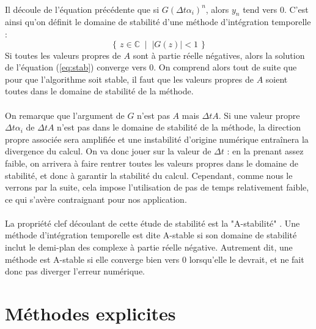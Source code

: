     \paragraph{}
    Il découle de l'équation précédente que si $G\left(\Delta t\alpha_i\right)^n$, alors $y_n$ tend vers 0.
    C'est ainsi qu'on définit le domaine de stabilité d'une méthode d'intégration temporelle :
    $$\left\{\,z\in\mathbb{C}\;\mid\;\left|G\left(z\right)\right| < 1\,\right\}$$
    Si toutes les valeurs propres de $A$ sont à partie réelle négatives, alors la solution de l'équation (\ref{eq:stab}) converge vers 0.
    On comprend alors tout de suite que pour que l'algorithme soit stable, il faut que les valeurs propres de $A$ soient toutes dans le domaine de stabilité de la méthode.

    \paragraph{}
    On remarque que l'argument de $G$ n'est pas $A$ mais $\Delta tA$.
    Si une valeur propre $\Delta t\alpha_i$ de $\Delta tA$ n'est pas dans le domaine de stabilité de la méthode, la direction propre associée sera amplifiée et une instabilité d'origine numérique entraînera la divergence du calcul.
    On va donc jouer sur la valeur de $\Delta t$ : en la prenant assez faible, on arrivera à faire rentrer toutes les valeurs propres dans le domaine de stabilité, et donc à garantir la stabilité du calcul.
    Cependant, comme nous le verrons par la suite, cela impose l'utilisation de pas de temps relativement faible, ce qui s'avère contraignant pour nos application.

    \paragraph{}
    La propriété clef découlant de cette étude de stabilité est la "A-stabilité" \cite{Dahlquist1963}.
    Une méthode d'intégration temporelle est dite A-stable si son domaine de stabilité inclut le demi-plan des complexe à partie réelle négative.
    Autrement dit, une méthode est A-stable si elle converge bien vers 0 lorsqu'elle le devrait, et ne fait donc pas diverger l'erreur numérique.


\section{Méthodes explicites}

